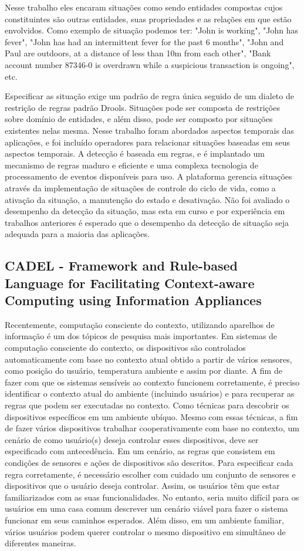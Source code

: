 \documentclass[12pt,a4paper,compsoc]{IEEEtran}
\begin{document}
Nesse trabalho eles encaram situações como sendo entidades compostas cujos constituintes são outras entidades, suas propriedades e as relações em que estão envolvidos. Como exemplo de situação podemos ter: "John is working", "John has fever", "John has had an intermittent fever for the past 6 months", "John and Paul are outdoors, at a distance of less than 10m from each other", "Bank account number 87346-0 is overdrawn while a suspicious transaction is ongoing", etc.


Especificar as situação exige um padrão de regra única seguido de um dialeto de restrição de regras padrão Drools. Situações pode ser composta de restrições sobre domínio de entidades, e além disso, pode ser composto por situações existentes nelas mesma. Nesse trabalho foram abordados aspectos temporais das aplicações, e foi incluído operadores para relacionar situações baseadas em seus aspectos temporais. A detecção é baseada em regras, e é implantado um mecanismo de regras maduro e eficiente e uma complexa tecnologia de processamento de eventos disponíveis para uso. A plataforma gerencia situações através da implementação de situações de controle do ciclo de vida, como a ativação da situação, a manutenção do estado e desativação. Não foi avaliado o desempenho da detecção da situação, mas esta em curso e por experiência em trabalhos anteriores é esperado que o desempenho da detecção de situação seja adequada para a maioria das aplicações. 


\subsection{CADEL - Framework and Rule-based Language for Facilitating Context-aware Computing using Information Appliances}

Recentemente, computação consciente do contexto, utilizando aparelhos de informação é um dos tópicos de pesquisa mais importantes. Em sistemas de computação consciente do contexto, os dispositivos são controlados automaticamente com base no contexto atual obtido a partir de vários sensores, como posição do usuário, temperatura ambiente e assim por diante. A fim de fazer com que os sistemas sensíveis ao contexto funcionem corretamente, é preciso identificar o contexto atual do ambiente (incluindo usuários) e para recuperar as regras que podem ser executadas no contexto. Como técnicas para descobrir os dispositivos específicos em um ambiente ubíquo. Mesmo com essas técnicas, a fim de fazer vários dispositivos trabalhar cooperativamente com base no contexto, um cenário de como usuário(s) deseja controlar esses dispositivos, deve ser especificado com antecedência. Em um cenário, as regras que consistem em condições de sensores e ações de dispositivos são descritos. Para especificar cada regra corretamente, é necessário escolher com cuidado um conjunto de sensores e dispositivos que o usuário deseja controlar. Assim, os usuários têm que estar familiarizados com as suas funcionalidades. No entanto, seria muito difícil para os usuários em uma casa comum descrever um cenário viável para fazer o sistema funcionar em seus caminhos esperados. Além disso, em um ambiente familiar, vários usuários podem querer controlar o mesmo dispositivo em simultâneo de diferentes maneiras.
\end{document}
